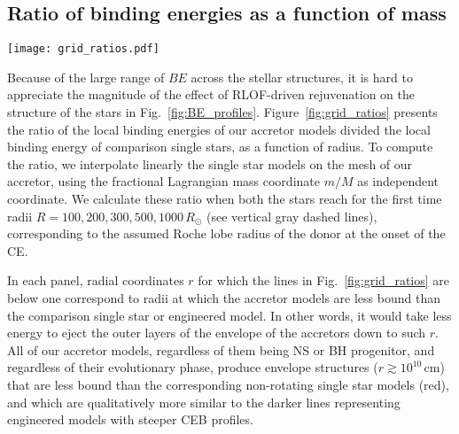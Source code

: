 \documentclass[twocolumn,twocolappendix,trackchanges]{aastex63}
\DeclareRobustCommand{\Figref}[1]{Fig.~\ref{#1}}
\begin{document}
{\subsection{Ratio of binding energies as a function of mass}

\begin{figure*}[htbp]
  \texttt{[image: grid\_ratios.pdf]}
  \caption{Ratios of the binding energy profiles (including internal
    energy) of the accretor stars divided stars of the same total mass
    post-RLOF. The red solid lines show the ratio to a non-rotating
    single star, while the other colors show the ratio to
    ``engineered'' star (see text). Each panel shows the ratios at the
    first time the models reach the radius indicated on the right and
    by the vertical dashed gray line.}
  \label{fig:grid_ratios}
\end{figure*}

Because of the large range of $BE$ across the stellar structures, it
is hard to appreciate the magnitude of the effect of RLOF-driven
rejuvenation on the structure of the stars in
\Figref{fig:BE_profiles}. Figure~\ref{fig:grid_ratios} presents the
ratio of the local binding energies of our accretor models divided the
local binding energy of comparison single stars, as a function of
radius. To compute the ratio, we interpolate linearly the single star
models on the mesh of our accretor, using the fractional Lagrangian
mass coordinate $m/M$ as independent coordinate. %
We calculate these ratio
when both the stars reach for the first time radii
$R=100, 200, 300, 500, 1000\,R_\odot$ (see vertical gray dashed
lines), corresponding to the assumed Roche lobe radius of the donor at
the onset of the CE.

In each panel, radial coordinates $r$ for which the lines in
\Figref{fig:grid_ratios} are below one correspond to radii at which
the accretor models are less bound than the comparison single
star or engineered model. In other words, it would take less energy to
eject the outer layers of the envelope of the accretors down to such
$r$. All of our accretor models, regardless of them being NS or BH
progenitor, and regardless of their evolutionary phase, produce
envelope structures ($r\gtrsim 10^{10}\,\mathrm{cm}$) that are less
bound than the corresponding non-rotating single star models (red),
and which are qualitatively more similar to the darker lines
representing engineered models with steeper CEB profiles.

}
\end{document}

